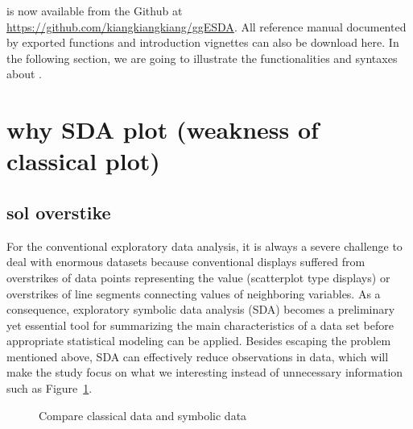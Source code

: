 \documentclass[article]{jss}
\begin{document}
 is now available from the Github at \url{https://github.com/kiangkiangkiang/ggESDA}. All reference manual documented by exported functions and introduction vignettes can also be download here. In the following section, we are going to illustrate the functionalities and syntaxes about .


\section{why SDA plot (weakness of classical plot)}

\subsection{sol overstike}
For the conventional exploratory data analysis, it is always a severe challenge to deal with enormous datasets because conventional displays suffered from overstrikes of data points representing the value (scatterplot type displays) or overstrikes of line segments connecting values of neighboring variables. As a consequence, exploratory symbolic data analysis (SDA) becomes a preliminary yet essential tool for summarizing the main characteristics of a data set before appropriate statistical modeling can be applied. Besides escaping the problem mentioned above, SDA can effectively reduce observations in data, which will make the study focus on what we interesting instead of unnecessary information such as Figure~\ref{fig:compare}.

\begin{figure}[htbp]
\centering
{}
\caption{\label{fig:compare} Compare classical data and symbolic data}
\end{figure}
\end{document}
